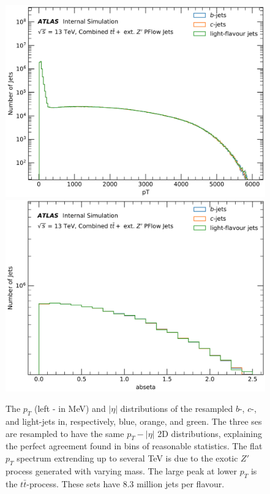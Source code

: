 \begin{figure}[h!]
  \center
  \includegraphics[scale=0.29]{Images/FTAG/added/distpt.png}
  \includegraphics[scale=0.29]{Images/FTAG/added/disteta.png}
  \caption{The $p_T$ (left - in MeV) and $|\eta|$ distributions of the resampled $b$-, $c$-, and light-jets in, respectively, blue, orange, and green. The three ses are resampled to have the same $p_T-|\eta|$ 2D distributions, explaining the perfect agreement found in bins of reasonable statistics. The flat $p_T$ spectrum extrending up to several TeV is due to the exotic $Z'$ process generated with varying mass. The large peak at lower $p_T$ is the $t\bar{t}$-process. These sets have 8.3 million jets per flavour.} 
  \label{fig:distTraining}
\end{figure}

